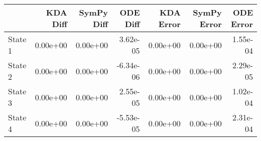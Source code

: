 \begin{tabular}{lrrrrrr}
\toprule
{} &  KDA Diff &  SymPy Diff &  ODE Diff &  KDA Error &  SymPy Error &  ODE Error \\
\midrule
State 1 &  0.00e+00 &    0.00e+00 &  3.62e-05 &   0.00e+00 &     0.00e+00 &   1.55e-04 \\
State 2 &  0.00e+00 &    0.00e+00 & -6.34e-06 &   0.00e+00 &     0.00e+00 &   2.29e-05 \\
State 3 &  0.00e+00 &    0.00e+00 &  2.55e-05 &   0.00e+00 &     0.00e+00 &   1.02e-04 \\
State 4 &  0.00e+00 &    0.00e+00 & -5.53e-05 &   0.00e+00 &     0.00e+00 &   2.31e-04 \\
\bottomrule
\end{tabular}

